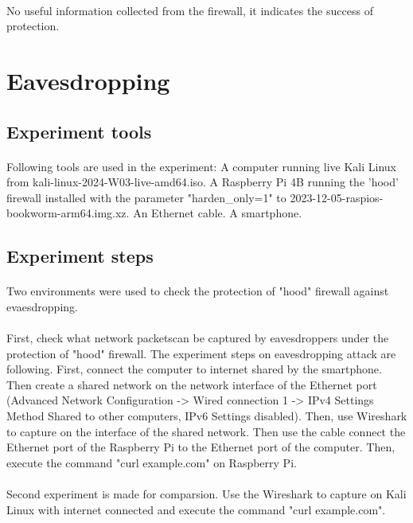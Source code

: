 \documentclass[mscthesis]{usiinfthesis}
\begin{document}
\paragraph{}
No useful information collected from the firewall, it indicates the success of protection.

\section{Eavesdropping}

\subsection{Experiment tools}
\paragraph{}
Following tools are used in the experiment: A computer running live Kali Linux from kali-linux-2024-W03-live-amd64.iso. A Raspberry Pi 4B running the 'hood' firewall installed with the parameter "harden\_only=1" to 2023-12-05-raspios-bookworm-arm64.img.xz. An Ethernet cable. A smartphone.

\subsection{Experiment steps}
\paragraph{}
Two environments were used to check the protection of "hood" firewall against evaesdropping.
\paragraph{}
First, check what network packetscan be captured by eavesdroppers under the protection of "hood" firewall. The experiment steps on eavesdropping attack are following. First, connect the computer to internet shared by the smartphone. Then create a shared network on the network interface of the Ethernet port (Advanced Network Configuration -> Wired connection 1 -> IPv4 Settings Method Shared to other computers, IPv6 Settings disabled). Then, use Wireshark to capture on the interface of the shared network. Then use the cable connect the Ethernet port of the Raspberry Pi to the Ethernet port of the computer. Then, execute the command "curl example.com" on Raspberry Pi.
\paragraph{}
Second experiment is made for comparsion. Use the Wireshark to capture on Kali Linux with internet connected and execute the command "curl example.com".
\end{document}
